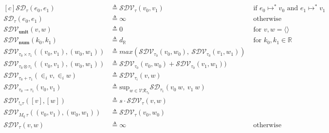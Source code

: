 \begin{definition}
  \begin{equation}
  \begin{aligned}[c]
    \mathcal{SD_{\tau}}(e_0, e_1) &\triangleq \mathcal{SDV}_{\tau}(v_0, v_1)
    &\text{ if } e_0 \mapsto^{*} v_0 \text{ and } e_1 \mapsto^{*} v_1 \\
    \mathcal{SD_{\tau}}(e_0, e_1) &\triangleq \infty &\text{ otherwise } \\
    \mathcal{SDV_{\mathbf{unit}}}(v, w) &\triangleq 0 &\text{ for } v, w = \langle \rangle \\
    \mathcal{SDV_{\mathbf{num}}}(k_0, k_1) &\triangleq 
      d_\mathbb{R} &\text{ for } k_0, k_1 \in \mathbb{R} \\
    \mathcal{SDV}_{\tau_0 \times \tau_1}((v_0, v_1), (w_0, w_1)) 
      &\triangleq max(\mathcal{SDV}_{\tau_0}(v_0, w_0),~\mathcal{SDV}_{\tau_0}(v_1, w_1))
    \\
    \mathcal{SDV}_{\tau_0 \otimes \tau_1}((v_0, v_1), (w_0, w_1)) 
      &\triangleq \mathcal{SDV}_{\tau_0}(v_0, w_0) + \mathcal{SDV}_{\tau_0}(v_1, w_1))
    \\
    \mathcal{SDV}_{\tau_0 + \tau_1}(\in_i v, \in_i w) 
      &\triangleq \mathcal{SDV}_{\tau_i}(v, w)
    \\
    \mathcal{SDV}_{\tau_0 \multimap \tau_1}(v_0, v_1) 
      &\triangleq \text{sup}_{w \in \mathcal{VR}_{\tau_0}} \mathcal{SD}_{\tau_1}(v_0~w,~v_1~w)
    \\
    \mathcal{SDV}_{!_s \tau}([v], [w]) 
      &\triangleq s \cdot \mathcal{SDV}_{\tau}(v, w)
    \\
    \mathcal{SDV}_{M_q~\tau}((v_0, v_1), (w_0, w_1)) 
      &\triangleq \mathcal{SDV}_{\tau}(v_0, w_0)
    \\
    \mathcal{SDV_{\tau}}(v, w) &\triangleq \infty &\text{ otherwise } \\
  \end{aligned}
  \end{equation}
\end{definition}


